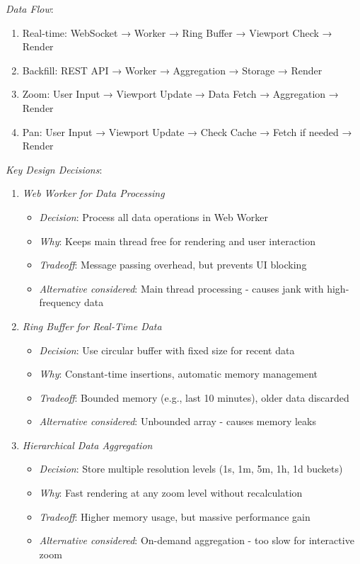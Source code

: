 \documentclass[11pt]{article}
\begin{document}
\emph{Data Flow}:

\begin{enumerate}
\item Real-time: WebSocket → Worker → Ring Buffer → Viewport Check → Render
\item Backfill: REST API → Worker → Aggregation → Storage → Render
\item Zoom: User Input → Viewport Update → Data Fetch → Aggregation → Render
\item Pan: User Input → Viewport Update → Check Cache → Fetch if needed → Render
\end{enumerate}

\emph{Key Design Decisions}:

\begin{enumerate}
\item \emph{Web Worker for Data Processing}

\begin{itemize}
\item \emph{Decision}: Process all data operations in Web Worker
\item \emph{Why}: Keeps main thread free for rendering and user interaction
\item \emph{Tradeoff}: Message passing overhead, but prevents UI blocking
\item \emph{Alternative considered}: Main thread processing - causes jank with high-frequency data
\end{itemize}

\item \emph{Ring Buffer for Real-Time Data}

\begin{itemize}
\item \emph{Decision}: Use circular buffer with fixed size for recent data
\item \emph{Why}: Constant-time insertions, automatic memory management
\item \emph{Tradeoff}: Bounded memory (e.g., last 10 minutes), older data discarded
\item \emph{Alternative considered}: Unbounded array - causes memory leaks
\end{itemize}

\item \emph{Hierarchical Data Aggregation}

\begin{itemize}
\item \emph{Decision}: Store multiple resolution levels (1s, 1m, 5m, 1h, 1d buckets)
\item \emph{Why}: Fast rendering at any zoom level without recalculation
\item \emph{Tradeoff}: Higher memory usage, but massive performance gain
\item \emph{Alternative considered}: On-demand aggregation - too slow for interactive zoom
\end{itemize}


\end{enumerate}
\end{document}
